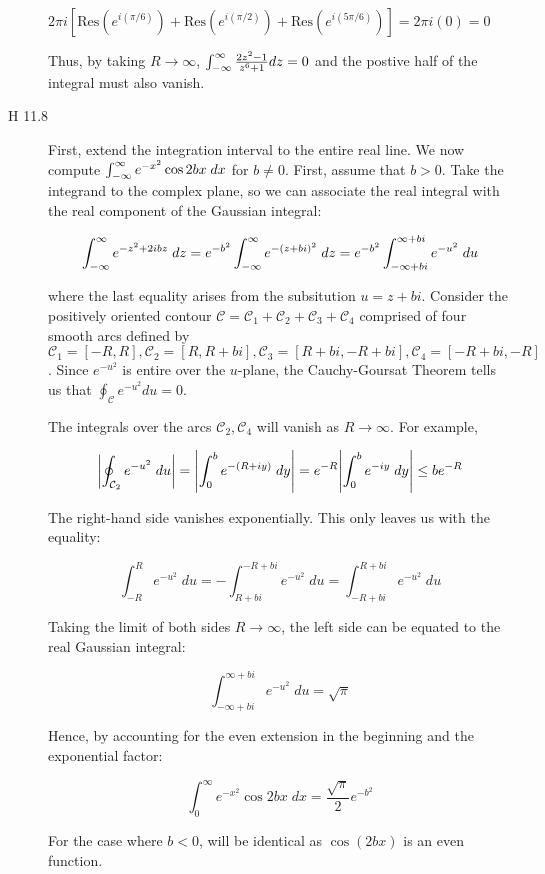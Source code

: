 \documentclass[12pt]{article}%
\newcommand{\C}{\mathcal{C}}
\begin{document}
\begin{description}
    $2\pi i\left[\text{Res}(e^{i(\pi/6)}) + \text{Res}(e^{i(\pi/2)}) + \text{Res}(e^{i(5\pi/6)})\right] = 2\pi i(0) = 0$

    Thus, by taking $R \rightarrow \infty$, $\int_{-\infty}^{\infty} \frac{2z^2 -1}{z^6 + 1} dz = 0$ and the postive half of the integral must also vanish.

  \item[H 11.8]
  First, extend the integration interval to the entire real line. We now compute $\int_{-\infty}^{\infty} e^{-x^2}\cos{2bx} \; dx$
  for $b \neq 0$. First, assume that $b > 0$. Take the integrand to the complex plane, so we can associate the real integral with the real component of the Gaussian integral:

  \[ \int_{-\infty}^{\infty} e^{-z^2 + 2ibz} \; dz = e^{-b^2} \int_{-\infty}^{\infty} e^{-(z + bi)^2} \; dz = e^{-b^2} \int_{-\infty + bi}^{\infty + bi} e^{-u^2} \; du\]

where the last equality arises from the subsitution $u = z + bi$. Consider the positively oriented contour $\C = \C_1 + \C_2 + \C_3 + \C_4$ comprised of four smooth arcs defined by $\C_1 = [-R, R], \C_2 = [R, R + bi], \C_3 = [R+bi, -R + bi], \C_4 = [-R + bi, -R]$. Since $e^{-u^2}$ is entire over the $u$-plane, the Cauchy-Goursat Theorem tells us that $\oint_\C e^{-u^2} du = 0$.

The integrals over the arcs $\C_2,\C_4$ will vanish as $R \rightarrow \infty$. For example,

\[ \abs{\oint_{\C_2} e^{-u^2} \; du} = \abs{\int_0^b e^{-(R + iy)} \; dy} = e^{-R} \abs{\int_0^b e^{-iy} \; dy} \leq be^{-R}\]

The right-hand side vanishes exponentially. This only leaves us with the equality:

\[ \int_{-R}^R e^{-u^2} \; du = -\int_{R + bi}^{-R + bi} e^{-u^2} \; du  = \int_{-R + bi}^{R + bi} e^{-u^2} \; du\]

Taking the limit of both sides $R \rightarrow \infty$, the left side can be equated to the real Gaussian integral:

\[\int_{-\infty + bi}^{\infty + bi} e^{-u^2} \; du = \sqrt{\pi} \]

Hence, by accounting for the even extension in the beginning and the exponential factor:

\[ \int_0^\infty e^{-x^2}\cos{2bx} \; dx = \frac{\sqrt{\pi}}{2}e^{-b^2}\]

For the case where $b < 0$, will be identical as $\cos(2bx)$ is an even function.


\end{description}
\end{document}
